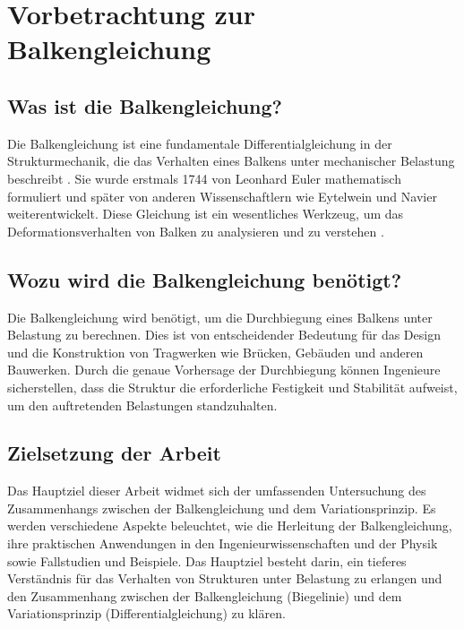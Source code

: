 %
%
%
%
\section{Vorbetrachtung zur Balkengleichung\label{balken:section:teil0}}
\subsection{Was ist die Balkengleichung?}
Die Balkengleichung ist eine fundamentale Differentialgleichung in der Strukturmechanik, die das Verhalten eines Balkens unter mechanischer Belastung beschreibt \cite{balken:Balkentheorie}.
Sie wurde erstmals 1744 von Leonhard Euler mathematisch formuliert und später von anderen Wissenschaftlern wie Eytelwein und Navier weiterentwickelt. 
%
%
%
%
%
%
Diese Gleichung ist ein wesentliches Werkzeug, um das Deformationsverhalten von Balken zu analysieren und zu verstehen \cite{balken:Biegelinie}.

\subsection{Wozu wird die Balkengleichung benötigt?}
Die Balkengleichung wird benötigt, um die Durchbiegung eines Balkens unter Belastung zu berechnen.
Dies ist von entscheidender Bedeutung für das Design und die Konstruktion von Tragwerken wie Brücken, Gebäuden und anderen Bauwerken. 
Durch die genaue Vorhersage der Durchbiegung können Ingenieure sicherstellen, dass die Struktur die erforderliche Festigkeit und Stabilität aufweist, um den auftretenden Belastungen standzuhalten.

\subsection{Zielsetzung der Arbeit}
Das Hauptziel dieser Arbeit widmet sich der umfassenden Untersuchung des Zusammenhangs zwischen der Balkengleichung und dem Variationsprinzip. 
Es werden verschiedene Aspekte beleuchtet, wie die Herleitung der Balkengleichung, ihre praktischen Anwendungen in den Ingenieurwissenschaften und der Physik sowie Fallstudien und Beispiele. 
Das Hauptziel besteht darin, ein tieferes Verständnis für das Verhalten von Strukturen unter Belastung zu erlangen und den Zusammenhang zwischen der Balkengleichung (Biegelinie) und dem Variationsprinzip (Differentialgleichung) zu klären.


